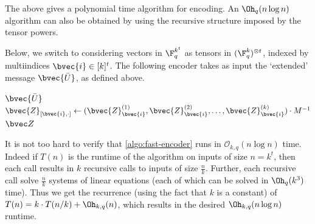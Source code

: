 \documentclass[11pt]{article}
\begin{document}
\begin{algorithm}[H]
	\caption{Polar Encoder}
	\label{algo:slow-encoder}
	\begin{algorithmic}[1]
		\State {}
		\EndProcedure
	\end{algorithmic}
\end{algorithm}


The above gives a polynomial time algorithm for encoding. An $\Oh_q(n\log n)$ algorithm can also be obtained by using the recursive structure imposed by the tensor powers.

Below, we switch to considering vectors in $\F_q^{k^t}$ as tensors in $(\F_q^k)^{\otimes t}$, indexed by multiindices $\bvec{i} \in [k]^t$.
The following encoder takes as input the `extended' message $\bvec{\bar U}$, as
defined above.

\begin{algorithm}[H]
	\caption{Fast Polar Encoder}
	\label{algo:fast-encoder}
	\begin{algorithmic}[1]
		\State \Return $\bvec{\bar U}$ 
		\EndIf
		\EndFor
		\State
		$\bvec{Z}_{[\bvec{i}, \cdot]} \gets  (
		\bvec{Z}^{(1)}_{\bvec{i}},
		\bvec{Z}^{(2)}_{\bvec{i}},
		\dots,
		\bvec{Z}^{(k)}_{\bvec{i}}
		)\cdot M^{-1}$
		\EndFor
		\State \Return $\bvec Z$
		\EndProcedure
	\end{algorithmic}
\end{algorithm}

It is not too hard to verify that \cref{algo:fast-encoder} runs in $\mathcal{O}_{k,q}(n\log n)$ time. Indeed if $T(n)$ is the runtime of the algorithm on inputs of size $n=k^t$, then each call results in $k$ recursive calls to inputs of size $\frac nk$. Further, each recursive call solve $\frac nk$ systems of linear equations (each of which can be solved in $\Oh_q(k^3)$ time). Thus we get the recurrence (using the fact that $k$ is a constant) of $T(n)=k\cdot T(n/k) + \Oh_{k,q}(n)$, which results in the desired $\Oh_{k,q}(n\log{n})$ runtime. 
\end{document}
